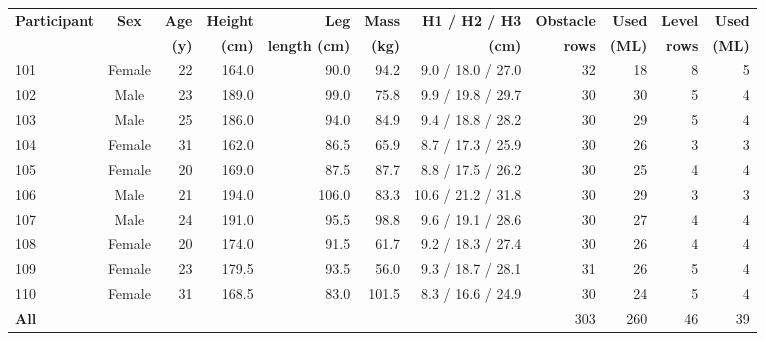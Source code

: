 \begin{tabular}{@{}l c r r r r r r r r r@{}}
\toprule
\textbf{Participant} & \textbf{Sex} & \textbf{Age} & \textbf{Height} & \textbf{Leg} & \textbf{Mass} & \textbf{H1 / H2 / H3} & \textbf{Obstacle} & \textbf{Used} & \textbf{Level} & \textbf{Used} \\
 & & \textbf{(y)} & \textbf{(cm)} & \textbf{length (cm)} & \textbf{(kg)} & \textbf{(cm)} & \textbf{rows} & \textbf{(ML)} & \textbf{rows} & \textbf{(ML)} \\
\midrule
101 & Female & 22 & 164.0 & 90.0 & 94.2 & 9.0 / 18.0 / 27.0 & 32 & 18 & 8 & 5 \\
102 & Male & 23 & 189.0 & 99.0 & 75.8 & 9.9 / 19.8 / 29.7 & 30 & 30 & 5 & 4 \\
103 & Male & 25 & 186.0 & 94.0 & 84.9 & 9.4 / 18.8 / 28.2 & 30 & 29 & 5 & 4 \\
104 & Female & 31 & 162.0 & 86.5 & 65.9 & 8.7 / 17.3 / 25.9 & 30 & 26 & 3 & 3 \\
105 & Female & 20 & 169.0 & 87.5 & 87.7 & 8.8 / 17.5 / 26.2 & 30 & 25 & 4 & 4 \\
106 & Male & 21 & 194.0 & 106.0 & 83.3 & 10.6 / 21.2 / 31.8 & 30 & 29 & 3 & 3 \\
107 & Male & 24 & 191.0 & 95.5 & 98.8 & 9.6 / 19.1 / 28.6 & 30 & 27 & 4 & 4 \\
108 & Female & 20 & 174.0 & 91.5 & 61.7 & 9.2 / 18.3 / 27.4 & 30 & 26 & 4 & 4 \\
109 & Female & 23 & 179.5 & 93.5 & 56.0 & 9.3 / 18.7 / 28.1 & 31 & 26 & 5 & 4 \\
110 & Female & 31 & 168.5 & 83.0 & 101.5 & 8.3 / 16.6 / 24.9 & 30 & 24 & 5 & 4 \\
\midrule
\textbf{All} & & & & & & & 303 & 260 & 46 & 39 \\
\bottomrule
\end{tabular}
